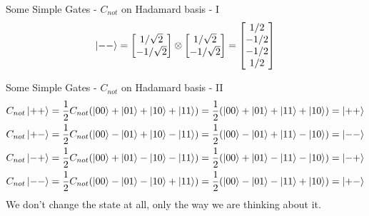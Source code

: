 \documentclass{beamer}
\begin{document}
\begin{frame}{Some Simple Gates - $C_{not}$ on Hadamard basis - I}
{\begin{align*}
      \ket{--} &= \begin{bmatrix} 1 / \sqrt{2} \\ - 1 / \sqrt{2}  \end{bmatrix} \otimes \begin{bmatrix} 1 / \sqrt{2} \\   - 1 / \sqrt{2} \end{bmatrix} = \begin{bmatrix}  1 / 2 \\ -1 / 2 \\ - 1 / 2 \\ 1 / 2 \end{bmatrix} \\
    \end{align*}
  }%

\end{frame}

\begin{frame}{Some Simple Gates - $C_{not}$ on Hadamard basis - II}
  {\tiny
    \begin{align*}
      C_{not}\ket{++} &= \frac{1}{2} C_{not} ( \ket{00} + \ket{01} + \ket{10}+ \ket{11} ) = \frac{1}{2} (\ket{00} + \ket{01} + \ket{11} + \ket{10} )  = \ket{++}\\
      C_{not}\ket{+-} &= \frac{1}{2} C_{not} ( \ket{00} - \ket{01} + \ket{10} - \ket{11} ) = \frac{1}{2} (\ket{00} - \ket{01} + \ket{11} - \ket{10} )  = \ket{--}\\
      C_{not}\ket{-+} &= \frac{1}{2} C_{not} ( \ket{00} + \ket{01} - \ket{10} - \ket{11} ) = \frac{1}{2} (\ket{00} + \ket{01} - \ket{11} - \ket{10} )  = \ket{-+}\\
      C_{not}\ket{--} &= \frac{1}{2} C_{not} ( \ket{00} - \ket{01} - \ket{10} + \ket{11} ) = \frac{1}{2} (\ket{00} - \ket{01} - \ket{11} + \ket{10} )  = \ket{+-}\\
    \end{align*}
    We don't change the state at all, only the way we are thinking about it.
  }%
\end{frame}
\end{document}
